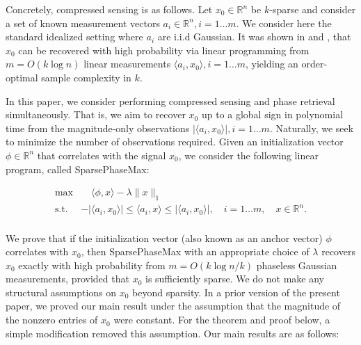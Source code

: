 \documentclass[12pt]{article}
\newcommand{\1}{\mathbf{1}}
\newcommand{\xo}{x_0}
\newcommand{\R}{\mathbb{R}}
\begin{document}
Concretely, compressed sensing is as follows.  Let $x_0 \in \mathbb{R}^n$ be $k$-sparse and consider a set of known measurement vectors $a_i \in \mathbb{R}^n, i = 1\ldots m$. We consider here the standard idealized setting where $a_i$ are i.i.d Gaussian. It was shown in \cite{CRT2005} and \cite{Donoho}, that $x_0$ can be recovered with high probability via linear programming from $m = O(k \log n)$ linear measurements $\langle a_i, x_0 \rangle, i=1\ldots m$, yielding an order-optimal sample complexity in $k$. 

In this paper, we consider performing compressed sensing and phase retrieval simultaneously. That is, we aim to recover $x_0$ up to a global sign in polynomial time from the magnitude-only observations $|\langle a_i, x_0 \rangle |, i =1\ldots m$.  Naturally, we seek to minimize the number of observations required.  Given an initialization vector $\phi \in \R^n$ that correlates with the signal $x_0$, we consider the following linear program, called SparsePhaseMax:

\begin{equation}\label{PhaseMax}
\begin{array}{ll}
\max & \phantom{-|}\langle \phi, x \rangle - \lambda \|x\|_1 \\[.5em]
\text{s.t.} & -|\langle a_i, x_0 \rangle | \leq \langle a_i, x \rangle \leq |\langle a_i, x_0 \rangle |, \quad  i = 1\ldots  m, \quad x \in \mathbb{R}^n.\\ 

\end{array}
\end{equation}


We prove that if the  initialization vector (also known as an anchor vector) $\phi$  correlates with $\xo$, then SparsePhaseMax with an appropriate choice of $\lambda$ recovers $\xo$ exactly with high probability from $m = O(k \log n/k)$ phaseless Gaussian measurements, provided that $x_0$ is sufficiently sparse. 
We do not make any structural assumptions on $\xo$ beyond sparsity.  In a prior version of the present paper, we proved our main result under the assumption that the magnitude of the nonzero entries of $\xo$ were constant.  For the theorem and proof below, a simple modification removed this assumption. Our main results are as follows:
\end{document}
